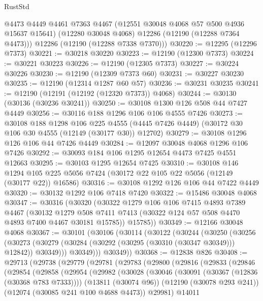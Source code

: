 \begin{lexlean}{RustStd}
\begin{coremodule}
        @4473
        @4449
        @4461
        @7363
        @4467
        (@12551 @30048 @4068 @57 @500 @4936 @15637 @15641)
        (@12280 @30048 @4068)
        @12286
        (@12190 (@12288 @7364 @4473)))
      @12286
      (@12190 (@12288 @7338 @7370)))
@30220 := @12295 (@12296 @7373)
@30221 := @30218 @30220
@30223 := @12190 (@12300 @7373)
@30224 := @30221 @30223
@30226 := @12190 (@12305 @7373)
@30227 := @30224 @30226
@30230 := @12190 (@12309 @7373 @60)
@30231 := @30227 @30230
@30235 := @12190 (@12314 @1287 @60 @57)
@30236 := @30231 @30235
@30241 := @12190 (@12191 (@12192 (@12320 @7373)) @4068)
@30244 := @30130 (@30136 (@30236 @30241))
@30250 := @30108 @1300 @126 @508 @44 @7427 @4449
@30256 := @30116 @188 @1296 @106 @106 @4555 @7426
@30273 := @30108
    @188
    @1298
    @106
    @225
    @4555
    (@4445 @7426 @4449)
    (@30172 @30 @106 @30 @4555 (@12149 (@30177 @30)) @12702)
@30279 := @30108 @1296 @126 @106 @44 @7426 @4449
@30284 := @12097 @30048 @4068 @1296 @106 @7426
@30292 := @30093 @184 @106 @1295 @12654 @4473 @7425 @4551 @12663
@30295 := @30103 @1295 @12654 @7425
@30310 := @30108
    @146
    @1294
    @105
    @225
    @5056
    @7424
    (@30172 @22 @105 @22 @5056 (@12149 (@30177 @22)) @16586)
@30316 := @30108 @1292 @126 @106 @44 @7422 @4449
@30320 := @30132 @1292 @106 @7418 @7420
@30322 := @15486 @30048 @4068
@30347 := @30316
    (@30320
      (@30322
        @1279
        @106
        @106
        @7415
        @4893
        @7389
        @4467
        (@30132 @1279 @508 @7411 @7413 (@30322 @124 @57 @508 @4470 @4893 @7400 @4467 @30181 @15785))
        @15785))
@30349 := @12166 @30048 @4068
@30367 := @30101
    (@30106
      (@30114
        (@30122
          (@30244
            (@30250
              (@30256
                (@30273 (@30279 (@30284 (@30292 (@30295 (@30310 (@30347 @30349))) @12842)) @30349)))
              @30349)))
        @30349))
@30368 := @12838 @826
@30408 := @29713
    (@29738
      (@29779
        (@29781
          (@29783
            (@29800
              (@29816
                (@29833
                  (@29846
                    (@29854
                      (@29858
                        (@29954
                          (@29982
                            (@30028
                              (@30046
                                (@30091 (@30367 (@12836 (@30368 @783 @7333))))
                                (@13811 (@30074 @96))
                                (@12190 (@30078 @293 @241))
                                (@12074 (@30085 @241 @100 @4688 @4473))
                                @29981)
                              @14011

\end{coremodule}
\end{lexlean}
